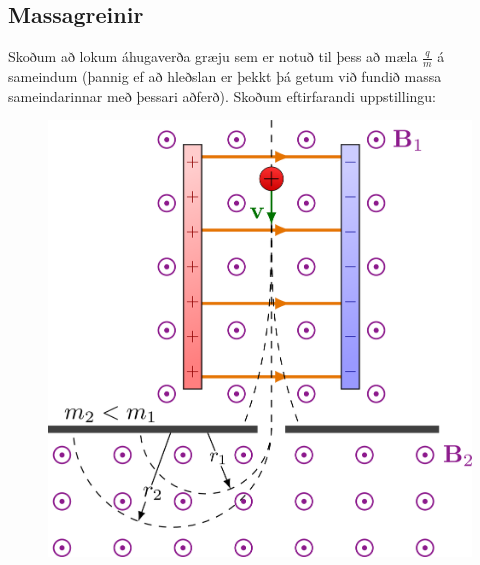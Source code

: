 \ifdefined \wholebook \else\documentclass[oneside]{book}\usepackage{EdlBook}\graphicspath{{figures/}}
\begin{document}
\subsection*{Massagreinir}

Skoðum að lokum áhugaverða græju sem er notuð til þess að mæla $\frac{q}{m}$ á sameindum (þannig ef að hleðslan er þekkt þá getum við fundið massa sameindarinnar með þessari aðferð). Skoðum eftirfarandi uppstillingu:

\begin{figure}[H]
    \centering
    \includegraphics[scale = 0.1]{figures/velocity_selector-002.png}
\end{figure}
\end{document}
